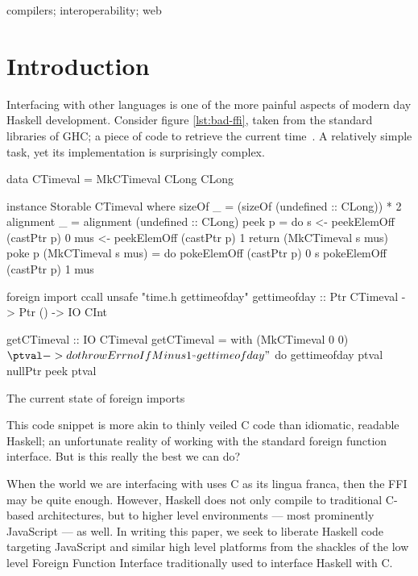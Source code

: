 \documentclass{sigplanconf}
\begin{document}
%
\keywords
compilers; interoperability; web

\section{Introduction}\label{sec:intro}

Interfacing with other languages is one of the more painful aspects of modern
day Haskell development. Consider figure \ref{lst:bad-ffi}, taken from the
standard libraries of GHC; a piece of code to retrieve the
current time\ \cite{time}. A relatively simple task, yet its implementation is
surprisingly complex.

\begin{listingfloat}
\begin{code}
data CTimeval = MkCTimeval CLong CLong

instance Storable CTimeval where
	sizeOf _ = (sizeOf (undefined :: CLong)) * 2
	alignment _ = alignment (undefined :: CLong)
	peek p = do
		s   <- peekElemOff (castPtr p) 0
		mus <- peekElemOff (castPtr p) 1
		return (MkCTimeval s mus)
	poke p (MkCTimeval s mus) = do
		pokeElemOff (castPtr p) 0 s
		pokeElemOff (castPtr p) 1 mus

foreign import ccall unsafe "time.h gettimeofday"
   gettimeofday :: Ptr CTimeval -> Ptr () -> IO CInt

getCTimeval :: IO CTimeval
getCTimeval = with (MkCTimeval 0 0) $ \ptval -> do
  throwErrnoIfMinus1_ "gettimeofday" $ do
    gettimeofday ptval nullPtr
  peek ptval
\end{code}
\caption{The current state of foreign imports}
\label{lst:bad-ffi}
\end{listingfloat}

This code snippet is more akin to thinly veiled C code than idiomatic, readable
Haskell; an unfortunate reality of working with the standard foreign function
interface. But is this really the best we can do?

When the world we are interfacing with uses C as its lingua franca, then the
FFI may be quite enough. However, Haskell does not only compile to
traditional C-based architectures, but to higher level environments --- most
prominently JavaScript --- as well. In writing this paper, we seek to liberate
Haskell code targeting JavaScript and similar high level platforms from the
shackles of the low level Foreign Function Interface traditionally used to
interface Haskell with C.
\end{document}
